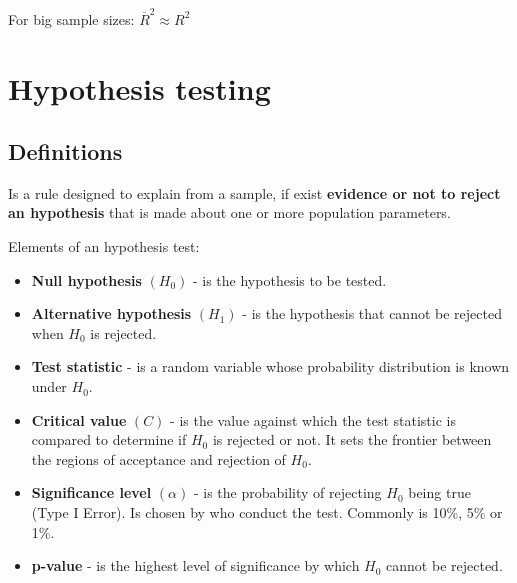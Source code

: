 \documentclass[10pt, a4paper, landscape]{article}
\begin{document}
\begin{multicols}{3}
For big sample sizes: \( \overline{R}^{2} \approx R^{2} \)

\section*{Hypothesis testing}

\subsection*{Definitions}

Is a rule designed to explain from a sample, if exist \textbf{evidence or not to reject an hypothesis} that is made about one or more population parameters.

Elements of an hypothesis test:

\begin{itemize}[leftmargin=*]
	\item \textbf{Null hypothesis} \( (H_{0}) \) - is the hypothesis to be tested.
	\item \textbf{Alternative hypothesis} \( (H_{1}) \) - is the hypothesis that cannot be rejected when \( H_{0} \) is rejected.
	\item \textbf{Test statistic} - is a random variable whose probability distribution is known under \( H_{0} \).
	\item \textbf{Critical value} \( (C) \) - is the value against which the test statistic is compared to determine if \( H_{0} \) is rejected or not. It sets the frontier between the regions of acceptance and rejection of \( H_{0} \).
	\item \textbf{Significance level} \( (\alpha) \) - is the probability of rejecting \( H_{0} \) being true (Type I Error). Is chosen by who conduct the test. Commonly is 10\%, 5\% or 1\%.
	\item \textbf{p-value} - is the highest level of significance by which \( H_{0} \) cannot be rejected.
\end{itemize}

\setlength{\multicolsep}{0pt}
\setlength{\columnsep}{20pt}
\begin{multicols}{2}



\end{multicols}
\end{multicols}
\end{document}
